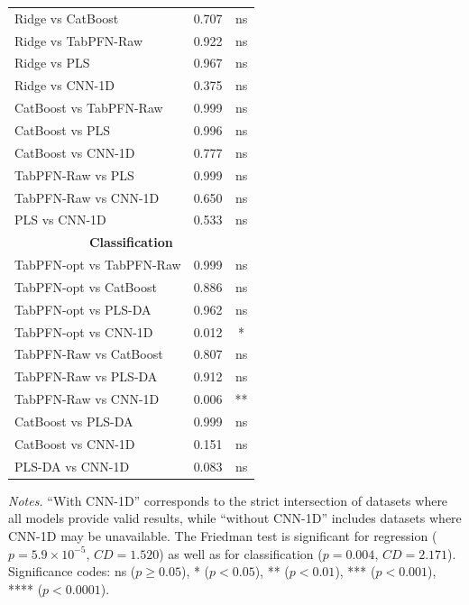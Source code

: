 \documentclass{article}
\begin{document}
\begin{table}[!htbp]
\begin{tabular}{lcc}
Ridge vs CatBoost        & 0.707 & ns \\
Ridge vs TabPFN-Raw      & 0.922 & ns \\
Ridge vs PLS             & 0.967 & ns \\
Ridge vs CNN-1D          & 0.375 & ns \\

CatBoost vs TabPFN-Raw   & 0.999 & ns \\
CatBoost vs PLS          & 0.996 & ns \\
CatBoost vs CNN-1D       & 0.777 & ns \\

TabPFN-Raw vs PLS        & 0.999 & ns \\
TabPFN-Raw vs CNN-1D     & 0.650 & ns \\

PLS vs CNN-1D            & 0.533 & ns \\

\midrule
\multicolumn{3}{c}{\textbf{Classification}} \\
\midrule
TabPFN-opt vs TabPFN-Raw & 0.999 & ns \\
TabPFN-opt vs CatBoost   & 0.886 & ns \\
TabPFN-opt vs PLS-DA     & 0.962 & ns \\
TabPFN-opt vs CNN-1D     & 0.012 & * \\

TabPFN-Raw vs CatBoost   & 0.807 & ns \\
TabPFN-Raw vs PLS-DA     & 0.912 & ns \\
TabPFN-Raw vs CNN-1D     & 0.006 & ** \\

CatBoost vs PLS-DA       & 0.999 & ns \\
CatBoost vs CNN-1D       & 0.151 & ns \\

PLS-DA vs CNN-1D         & 0.083 & ns \\

\bottomrule
\end{tabular}

\vspace{0.4em}
\begin{minipage}{0.95\linewidth}
\footnotesize
\textit{Notes.} ``With CNN-1D'' corresponds to the strict intersection of datasets where all models provide valid results, while ``without CNN-1D'' includes datasets where CNN-1D may be unavailable. The Friedman test is significant for regression ($p = 5.9 \times 10^{-5}$, $CD = 1.520$) as well as for classification ($p = 0.004$, $CD = 2.171$). Significance codes: ns ($p \geq 0.05$), * ($p < 0.05$), ** ($p < 0.01$), *** ($p < 0.001$), **** ($p < 0.0001$).
\end{minipage}
\end{table}
\end{document}
